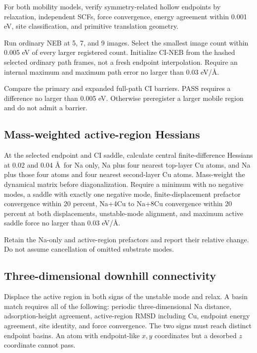 For both mobility models, verify symmetry-related hollow endpoints by relaxation,
independent SCFs, force convergence, energy agreement within 0.001 eV, site
classification, and primitive translation geometry.

Run ordinary NEB at 5, 7, and 9 images.  Select the smallest image count within
0.005 eV of every larger registered count.  Initialize CI-NEB from the hashed
selected ordinary path frames, not a fresh endpoint interpolation.  Require an
internal maximum and maximum path error no larger than 0.03 eV/\AA.

Compare the primary and expanded full-path CI barriers.  PASS requires a
difference no larger than 0.005 eV.  Otherwise preregister a larger mobile region
and do not admit a barrier.

\subsection*{Mass-weighted active-region Hessians}

At the selected endpoint and CI saddle, calculate central finite-difference
Hessians at 0.02 and 0.04 \AA\ for Na only, Na plus four nearest top-layer Cu
atoms, and Na plus those four atoms and four nearest second-layer Cu atoms.
Mass-weight the dynamical matrix before diagonalization.  Require a minimum with
no negative modes, a saddle with exactly one negative mode, finite-displacement
prefactor convergence within 20 percent, Na+4Cu to Na+8Cu convergence within
20 percent at both displacements, unstable-mode alignment, and maximum active
saddle force no larger than 0.03 eV/\AA.

Retain the Na-only and active-region prefactors and report their relative change.
Do not assume cancellation of omitted substrate modes.

\subsection*{Three-dimensional downhill connectivity}

Displace the active region in both signs of the unstable mode and relax.  A basin
match requires all of the following: periodic three-dimensional Na distance,
adsorption-height agreement, active-region RMSD including Cu, endpoint energy
agreement, site identity, and force convergence.  The two signs must reach
distinct endpoint basins.  An atom with endpoint-like $x,y$ coordinates but a
desorbed $z$ coordinate cannot pass.

